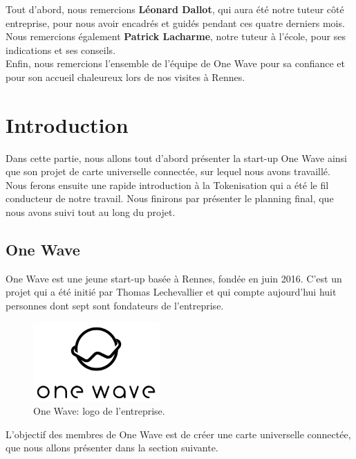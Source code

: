\documentclass{report}
\begin{document}
\noindent
Tout d'abord, nous remercions \textbf{Léonard Dallot}, qui aura été notre tuteur côté entreprise, pour nous avoir encadrés et guidés pendant ces quatre derniers mois.\\ 

\noindent
Nous remercions également \textbf{Patrick Lacharme}, notre tuteur à l'école, pour ses indications et ses conseils.\\

\noindent
Enfin, nous remercions l'ensemble de l'équipe de One Wave pour sa confiance et pour son accueil chaleureux lors de nos visites à Rennes.



\tableofcontents



\chapter{Introduction}
Dans cette partie, nous allons tout d'abord présenter la start-up One Wave ainsi que son projet de carte universelle connectée, sur lequel nous avons travaillé. Nous ferons ensuite une rapide introduction à la Tokenisation qui a été le fil conducteur de notre travail. Nous finirons par présenter le planning final, que nous avons suivi tout au long du projet.


\section{One Wave}
One Wave est une jeune start-up basée à Rennes, fondée en juin 2016. C'est un projet qui a été initié par Thomas Lechevallier et qui compte aujourd'hui huit personnes dont sept sont fondateurs de l'entreprise.

\begin{figure}[!h]
    \centering
			\includegraphics{img/onewave.png}
			\caption{\label{One Wave} One Wave: logo de l'entreprise.}			
\end{figure}

L'objectif des membres de One Wave est de créer une carte universelle connectée, que nous allons présenter dans la section  suivante.
\end{document}
